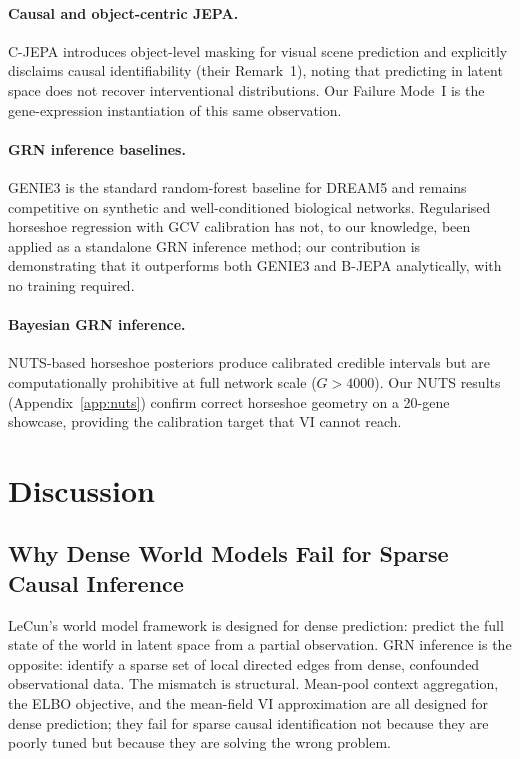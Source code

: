 \documentclass[11pt]{article}
\begin{document}
\paragraph{Causal and object-centric JEPA.}
C-JEPA \citep{cjepa2024} introduces object-level masking for visual scene
prediction and explicitly disclaims causal identifiability (their Remark~1),
noting that predicting in latent space does not recover interventional
distributions.
Our Failure Mode~I is the gene-expression instantiation of this same observation.

\paragraph{GRN inference baselines.}
GENIE3 \citep{huynh2010} is the standard random-forest baseline for DREAM5 and
remains competitive on synthetic and well-conditioned biological networks.
Regularised horseshoe regression with GCV calibration \citep{piironen2017,golub1979}
has not, to our knowledge, been applied as a standalone GRN inference method;
our contribution is demonstrating that it outperforms both GENIE3 and B-JEPA
analytically, with no training required.

\paragraph{Bayesian GRN inference.}
NUTS-based horseshoe posteriors \citep{gelman2013,carvalho2010} produce
calibrated credible intervals but are computationally prohibitive at full network
scale ($G > 4000$).
Our NUTS results (Appendix~\ref{app:nuts}) confirm correct horseshoe geometry
on a 20-gene showcase, providing the calibration target that VI cannot reach.

\section{Discussion}

\subsection{Why Dense World Models Fail for Sparse Causal Inference}

LeCun's world model framework \citep{lecun2022} is designed for dense
prediction: predict the full state of the world in latent space from a partial
observation.
GRN inference is the opposite: identify a sparse set of local directed edges
from dense, confounded observational data.
The mismatch is structural.
Mean-pool context aggregation, the ELBO objective, and the mean-field VI
approximation are all designed for dense prediction; they fail for sparse causal
identification not because they are poorly tuned but because they are solving
the wrong problem.
\end{document}
